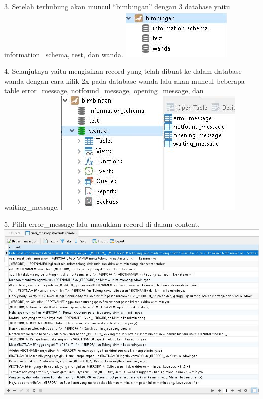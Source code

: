 \documentclass{article}
\begin{document}
        \item 3.	Setelah terhubung akan muncul “bimbingan” dengan 3 database yaitu information_schema, test, dan wanda.
            \newline
            \includegraphics[scale=0.8]{28.3.jpg}
            \newline
        \item 4.	Selanjutnya yaitu mengisikan record yang telah dibuat ke dalam database wanda dengan cara kilik 2x pada database wanda lalu akan muncul beberapa table error_message, notfound_message, opening_message, dan waiting_message.
            \newline
            \includegraphics[scale=0.5]{28.5.jpg}
            \newline
        \item 5.	Pilih error\_message lalu masukkan record di dalam content.
            \newline
            \includegraphics[scale=0.4]{28.4.jpg}
            \newline
\end{document}
